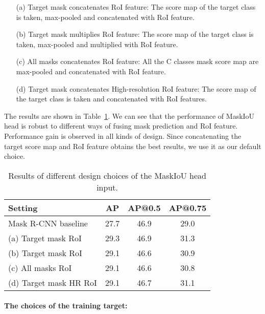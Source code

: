 \documentclass[10pt,twocolumn,letterpaper]{article}
\begin{document}
    
    \begin{itemize}
    \setlength\itemsep{0.0em}
    \item[(a)] Target mask concatenates RoI feature: The score map of the target class is taken, max-pooled and concatenated with RoI feature.
    \item[(b)] Target mask multiplies RoI feature: The score map of the target class is taken, max-pooled and multiplied with RoI feature.
    \item[(c)] All masks concatenates RoI feature: All the C classes mask score map are max-pooled and concatenated with RoI feature.
    \item[(d)] Target mask concatenates High-resolution RoI feature: The score map of the target class is taken and concatenated with  RoI features.
    \end{itemize}
    
    


    The results are shown in Table~\ref{table:fusingtypes}. We can see that the performance of MaskIoU head is robust to different ways of fusing mask prediction and RoI feature. Performance gain is observed in all kinds of design. Since concatenating the target score map and RoI feature obtains the best results, we use it as our default choice. 

\begin{table}
\caption{Results of different design choices of the MaskIoU head input.}
\vspace{3mm}
  \centering
{\begin{tabular}{l|c c c}
  \toprule
    Setting & AP & AP@0.5 & AP@0.75 \\
    \midrule
    Mask R-CNN baseline & 27.7 & 46.9 & 29.0 \\
    (a) Target mask  RoI & 29.3 & 46.9 & 31.3 \\
    (b) Target mask  RoI & 29.1 & 46.6 & 30.9 \\
    (c) All masks  RoI & 29.1 & 46.6 & 30.8 \\
    (d) Target mask  HR RoI & 29.1 & 46.7 & 31.1 \\
    \bottomrule
  \end{tabular}}
  \label{table:fusingtypes}
\end{table}     
    
    
\paragraph{The choices of the training target:}
\end{document}
